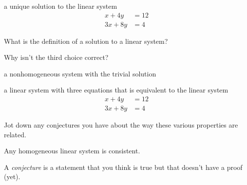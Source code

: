 \documentclass[hidelinks,12pt,handout]{ximera}
\begin{document}
\begin{question}a unique solution to the linear system 
	\begin{align*} x + 4 y &=  12 \\
				   3x + 8y &= 4
	\end{align*}
\begin{prompt}
\begin{multipleChoice}
\end{multipleChoice}
\end{prompt}

\begin{hint}
What is the definition of a solution to a linear system?
\end{hint}
\begin{hint}
Why isn't the third choice correct?
\end{hint}
\end{question}

\begin{question}
a nonhomogeneous system with the trivial solution
\vfill
\end{question}

\begin{question} a linear system with three equations that is equivalent to the linear system
	\begin{align*} x + 4 y &= 12 \\
				   3x + 8y &= 4
	\end{align*}
	\vfill
\end{question}

\begin{question} Jot down any conjectures you have about the way these various properties are related.

\begin{prompt}
	\begin{freeResponse}
			Any homogeneous linear system is consistent.
	\end{freeResponse}
\end{prompt}

\begin{hint} A \textit{conjecture} is a statement that you think is true but that doesn't have a proof (yet). 
\end{hint}
\vfill
\end{question}
\end{document}

